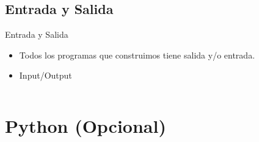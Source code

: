 \documentclass[usenames, dvipsnames, compress]{beamer}
\begin{document}
	\subsection{Entrada y Salida}
	\begin{frame}{Entrada y Salida}
		\begin{itemize}
			\item Todos los programas que construimos tiene salida y/o entrada.
			\pause
			\item [] \begin{block}{Input/Output}
				\inputminted[xleftmargin=\parindent,linenos]{python}{codes/input_output.m}
			\end{block}
		\end{itemize}
	\end{frame}
\section{Python (Opcional)}
\end{document}
